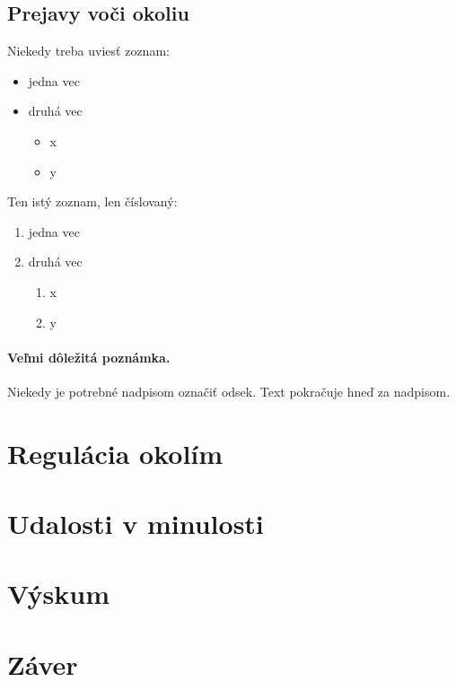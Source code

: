 \documentclass[10pt,twoside,slovak,a4paper]{article}
\begin{document}
\subsection{Prejavy voči okoliu} \label{ina:okolie}

Niekedy treba uviesť zoznam:

\begin{itemize}
\item jedna vec
\item druhá vec
	\begin{itemize}
	\item x
	\item y
	\end{itemize}
\end{itemize}

Ten istý zoznam, len číslovaný:

\begin{enumerate}
\item jedna vec
\item druhá vec
	\begin{enumerate}
	\item x
	\item y
	\end{enumerate}
\end{enumerate}

\paragraph{Veľmi dôležitá poznámka.}
Niekedy je potrebné nadpisom označiť odsek. Text pokračuje hneď za nadpisom.

\section{Regulácia okolím} \label{regulacia}


\section{Udalosti v minulosti} \label{minulost}



\section{Výskum} \label{vyskum}



\section{Záver} \label{zaver} %






\end{document}
